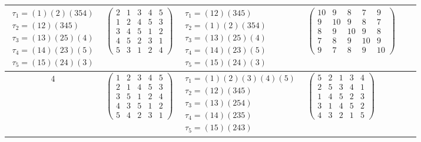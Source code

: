 \begin{longtable}{|c|p{2.7cm}|p{2.7cm}|p{2.7cm}|p{2.7cm}|p{3.3cm}|}
    $\begin{array}{l}\tau_{1}=(1)(2)(354)\\ \tau_{2}=(12)(345)\\ \tau_{3}=(13)(25)(4)\\ \tau_{4}=(14)(23)(5)\\ \tau_{5}=(15)(24)(3)\end{array}$ &
    $\begin{pmatrix}2&1&3&4&5\\1&2&4&5&3\\3&4&5&1&2\\4&5&2&3&1\\5&3&1&2&4\end{pmatrix}$                                                         &
    $\begin{array}{l}\tau_{1}=(12)(345)\\ \tau_{2}=(1)(2)(354)\\ \tau_{3}=(13)(25)(4)\\ \tau_{4}=(14)(23)(5)\\ \tau_{5}=(15)(24)(3)\end{array}$ &
    $\begin{pmatrix}10&9&8&7&9\\9&10&9&8&7\\8&9&10&9&8\\7&8&9&10&9\\9&7&8&9&10\end{pmatrix}$                                                                                                                                \\
    \hline
    4                                                                                                                                           &
    $\begin{pmatrix}1&2&3&4&5\\2&1&4&5&3\\3&5&1&2&4\\4&3&5&1&2\\5&4&2&3&1\end{pmatrix}$                                                         &
    $\begin{array}{l}\tau_{1}=(1)(2)(3)(4)(5)\\ \tau_{2}=(12)(345)\\ \tau_{3}=(13)(254)\\ \tau_{4}=(14)(235)\\ \tau_{5}=(15)(243)\end{array}$   &
    $\begin{pmatrix}5&2&1&3&4\\2&5&3&4&1\\1&4&5&2&3\\3&1&4&5&2\\4&3&2&1&5\end{pmatrix}$                                                         &

\end{longtable}
